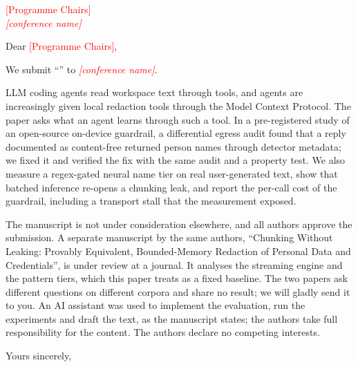 \documentclass[10pt]{letter}
\date{\today}
\newcommand{\Venue}{\textcolor{red}{[conference name]}}
\newcommand{\Chairs}{\textcolor{red}{[Programme Chairs]}}
\begin{document}
\begin{letter}{\Chairs\\ \emph{\Venue}}

\opening{Dear \Chairs,}

We submit ``\ssTitle'' to \emph{\Venue}.

LLM coding agents read workspace text through tools, and agents are increasingly given local redaction tools through the Model Context Protocol. The paper asks what an agent learns through such a tool. In a pre-registered study of an open-source on-device guardrail, a differential egress audit found that a reply documented as content-free returned person names through detector metadata; we fixed it and verified the fix with the same audit and a property test. We also measure a regex-gated neural name tier on real user-generated text, show that batched inference re-opens a chunking leak, and report the per-call cost of the guardrail, including a transport stall that the measurement exposed.

The manuscript is not under consideration elsewhere, and all authors approve the submission. A separate manuscript by the same authors, ``Chunking Without Leaking: Provably Equivalent, Bounded-Memory Redaction of Personal Data and Credentials'', is under review at a journal. It analyses the streaming engine and the pattern tiers, which this paper treats as a fixed baseline. The two papers ask different questions on different corpora and share no result; we will gladly send it to you. An AI assistant was used to implement the evaluation, run the experiments and draft the text, as the manuscript states; the authors take full responsibility for the content. The authors declare no competing interests.

\closing{Yours sincerely,}

\end{letter}
\end{document}
